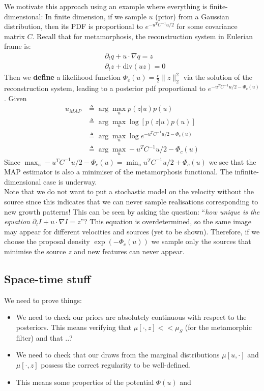 \documentclass{article}
\newcommand{\norm}[2]{\| #1 \|_{ #2 }}
\newcommand{\ltwonorm}[1]{\norm{ #1 }{2}}
\begin{document}
We motivate this approach using an example where everything is finite-dimensional:
In finite dimension, if we sample $u$ (prior) from a Gaussian distribution,
then its PDF is proportional to $e^{-u^TC^{-1}u/2}$ for some covariance matrix
$C$. Recall that for metamorphosis, the reconstruction system in Eulerian frame
is:
\begin{subequations}\label{eq:reconst}
\begin{align}
& \partial_t q + u\cdot\nabla q = z\\
& \partial_t z + \text{div}(u z) = 0
\end{align}
\end{subequations}
Then we \textbf{define} a likelihood function $\Phi_c(u)=\frac c2\ltwonorm{z}^2$
via the solution of the reconstruction system, leading to a posterior pdf
proportional to $e^{-u^TC^{-1}u/2 - \Phi_c(u)}$.
Given
\begin{align*}
u_{MAP} & \triangleq \arg\max_u p(z|u)p(u)\\
        & \triangleq \arg\max_u \log [ p(z|u)p(u)]\\
        & \triangleq \arg\max_u \log e^{-u^TC^{-1}u/2 - \Phi_c(u)}\\
        & \triangleq \arg\max_u - u^TC^{-1}u/2 - \Phi_c(u)
\end{align*}
Since $\max_u - u^TC^{-1}u/2 - \Phi_c(u)= \min_u u^TC^{-1}u/2 + \Phi_c(u)$ we
see that the MAP estimator is also a minimiser of the metamorphosis functional.
The infinite-dimensional case is underway.\\

Note that we do not want to put a stochastic model on the velocity without the
source since this indicates that we can never sample realisations corresponding
to new growth patterns! This can be seen by asking the question: ``\textit{how
unique is the equation $\partial_t I + u\cdot\nabla I = z$}''? This equation is
overdetermined, so the same image may appear for different velocities and
sources (yet to be shown). Therefore, if we choose the proposal density
$\exp(-\Phi_c(u))$ we sample only the sources that minimise the source $z$ and
new features can never appear.

\subsection{Space-time stuff}

We need to prove things:
\begin{itemize}
\item We need to check our priors are absolutely continuous with respect to the
posteriors. This means verifying that $\mu[\cdot, z]<<\mu_S$ (for the
metamorphic filter) and that ..?
\item We need to check that our draws from the marginal distributions $\mu[u,
\cdot]$ and $\mu[\cdot, z]$ possess the correct regularity to be well-defined.
\item This means some properties of the potential $\Phi(u)$ and
\end{itemize}
\end{document}
